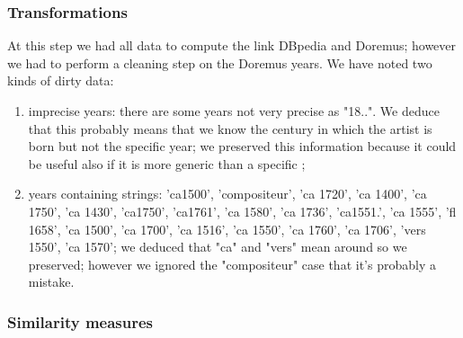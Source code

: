 \documentclass[paper=a4, fontsize=11pt]{scrartcl}
\begin{document}
\subsubsection{Transformations}
At this step we had all data to compute the link DBpedia and Doremus; however we had to perform a cleaning step on the Doremus years. We have noted two kinds of dirty data:
\begin{enumerate}

\item imprecise years: there are some years not very precise as "18..". We deduce that this probably means that we know the century in which the artist is born but not the specific year; we preserved this information because it could be useful also if it is more generic than a specific ;

\item years containing strings: 'ca1500', 'compositeur', 'ca 1720', 'ca 1400', 'ca 1750', 'ca 1430', 'ca1750', 'ca1761', 'ca 1580', 'ca 1736', 'ca1551.', 'ca 1555', 'fl 1658', 'ca 1500', 'ca 1700', 'ca 1516', 'ca 1550', 'ca 1760', 'ca 1706', 'vers 1550', 'ca 1570'; we deduced that "ca" and "vers" mean around so we preserved; however we ignored the "compositeur" case that it's probably a mistake.

\end{enumerate}
\subsubsection{Similarity measures}
\end{document}
